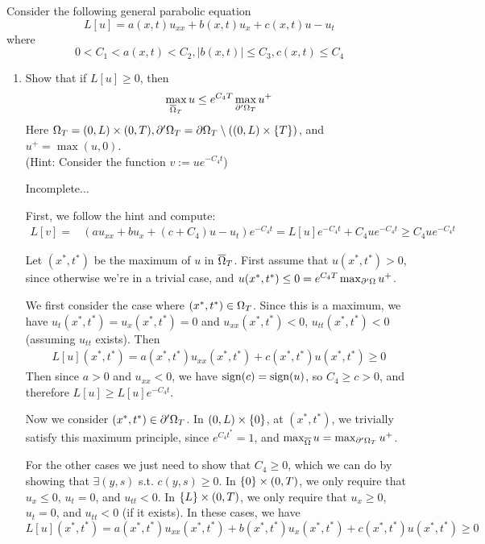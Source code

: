 Consider the following general parabolic equation
$$
L[u] = a(x, t) u_{xx} + b(x, t) u_x + c(x, t) u - u_t
$$
where
$$
0 < C_1 < a(x, t) < C_2, |b(x, t)| \leq C_3, c(x, t) \leq C_4
$$
\begin{enumerate}
\item
  Show that if $L[u] \geq 0$, then
  $$
  \max \limits_{\overline{\Omega}_T} u \leq e^{C_4 T} \max \limits_{\partial' \Omega_T} u^+
  $$
  Here $\Omega_T = (0, L) \times (0, T), \partial '\Omega_T = \partial \Omega_T \setminus ((0, L) \times \{ T \})$, and $u^+ = \max(u, 0)$.\\
  (Hint: Consider the function $v := u e^{-C_4 t}$)

  Incomplete...

  First, we follow the hint and compute:
  \begin{align*}
  L[v] = &(a u_{xx} + b u_x + (c + C_4) u - u_t)e^{-C_4 t} = L[u] e^{-C_4 t} + C_4 u e^{-C_4 t} \geq C_4 u e^{-C_4 t}
  \end{align*}

  Let $(x^*, t^*)$ be the maximum of $u$ in $\overline{\Omega}_T$.
  First assume that $u(x^*, t^*) > 0$, since otherwise we're in a trivial case, and $u(x^*, t^*) \leq 0 = e^{C_4 T}\max_{\partial '\Omega} u^+$.

  We first consider the case where $(x^*, t^*) \in \Omega_T$.
  Since this is a maximum, we have $u_t(x^*, t^*) = u_x(x^*, t^*) = 0$
  and $u_{xx}(x^*, t^*) <  0$, $u_{tt}(x^*, t^*) < 0$ (assuming $u_{tt}$ exists).
  Then
  \begin{align*}
  L[u](x^*, t^*) = a(x^*, t^*) u_{xx}(x^*, t^*) + c(x^*, t^*) u(x^*, t^*) \geq 0
  \end{align*}
  Then since $a > 0$ and $u_{xx} < 0$, we have $\operatorname{sign}(c) = \operatorname{sign}(u)$, so $C_4 \geq c > 0$, and therefore $L[u] \geq L[u] e^{-C_4 t}$.

  Now we consider $(x^*, t^*) \in \partial '\Omega_T$.
  In $(0, L) \times \{ 0 \}$, at $(x^*, t^*)$, we trivially satisfy this maximum principle, since $e^{C_4 t^*} = 1$,
  and $\max_{\overline{\Omega}} u = \max_{\partial '\Omega_T} u^+$.

  For the other cases we just need to show that $C_4 \geq 0$,
  which we can do by showing that $\exists (y, s)$ s.t. $c(y, s) \geq 0$.
  In $\{ 0 \} \times (0, T)$, we only require that $u_x \leq 0$, $u_t = 0$, and $u_{tt} < 0$.
  In $\{ L \} \times (0, T)$, we only require that $u_x \geq 0$, $u_t = 0$, and $u_{tt} < 0$ (if it exists).
  In these cases, we have
  $$
  L[u](x^*, t^*) = a(x^*, t^*) u_{xx}(x^*, t^*) + b(x^*, t^*) u_x(x^*, t^*) + c(x^*, t^*) u(x^*, t^*) \geq 0
  $$


\end{enumerate}
